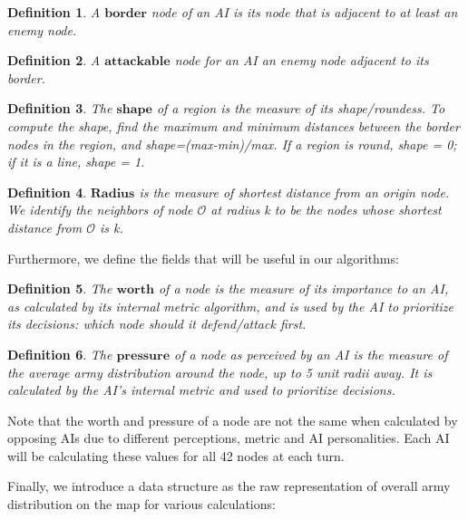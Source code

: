 \documentclass[12pt]{article}  %
\newtheorem{definition}{Definition}
\begin{document}
\begin{definition} \label{border}
A $\textbf{border}$ node of an AI is its node that is adjacent to at least an enemy node.
\end{definition}

\begin{definition} \label{attackable}
A $\textbf{attackable}$ node for an AI an enemy node adjacent to its border.
\end{definition}

\begin{definition} \label{shape}
The $\textbf{shape}$ of a region is the measure of its shape/roundess. To compute the shape, find the maximum and minimum distances between the border nodes in the region, and shape=(max-min)/max. If a region is round, shape = 0; if it is a line, shape = 1.
\end{definition}

\begin{definition} \label{radius}
$\textbf{Radius}$ is the measure of shortest distance from an origin node. We identify the neighbors of node $\mathcal{O}$ at radius k to be the nodes whose shortest distance from $\mathcal{O}$ is k.
\end{definition}


Furthermore, we define the fields that will be useful in our algorithms:

\begin{definition} \label{worth}
The $\textbf{worth}$ of a node is the measure of its importance to an AI, as calculated by its internal metric algorithm, and is used by the AI to prioritize its decisions: which node should it defend/attack first.
\end{definition}

\begin{definition} \label{pressure}
The $\textbf{pressure}$ of a node as perceived by an AI is the measure of the average army distribution around the node, up to 5 unit radii away. It is calculated by the AI's internal metric and used to prioritize decisions.
\end{definition}

Note that the worth and pressure of a node are not the same when calculated by opposing AIs due to different perceptions, metric and AI personalities. Each AI will be calculating these values for all 42 nodes at each turn.

Finally, we introduce a data structure as the raw representation of overall army distribution on the map for various calculations:
\end{document}
